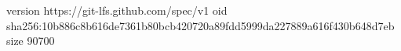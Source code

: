version https://git-lfs.github.com/spec/v1
oid sha256:10b886c8b616de7361b80bcb420720a89fdd5999da227889a616f430b648d7eb
size 90700
